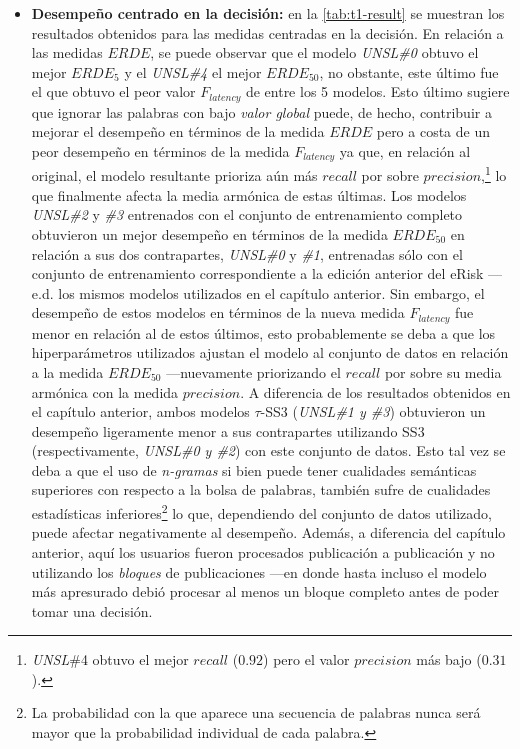 \begin{itemize}
    \item \textbf{Desempeño centrado en la decisión:} en la \autoref{tab:t1-result} se muestran los resultados obtenidos para las medidas centradas en la decisión.
    En relación a las medidas $ERDE$, se puede observar que el modelo \emph{UNSL\#0} obtuvo el mejor $ERDE_5$ y el \emph{UNSL\#4} el mejor $ERDE_{50}$, no obstante, este último fue el que obtuvo el peor valor $F_{latency}$ de entre los 5 modelos.
    Esto último sugiere que ignorar las palabras con bajo \emph{valor global} puede, de hecho, contribuir a mejorar el desempeño en términos de la medida $ERDE$ pero a costa de un peor desempeño en términos de la medida $F_{latency}$ ya que, en relación al original, el modelo resultante prioriza aún más $recall$ por sobre $precision$,\footnote{\emph{UNSL}\#4 obtuvo el mejor $recall$ ($0.92$) pero el valor $precision$ más bajo ($0.31$).} lo que finalmente afecta la media armónica de estas últimas.
    Los modelos \emph{UNSL\#2} y \emph{\#3} entrenados con el conjunto de entrenamiento completo obtuvieron un mejor desempeño en términos de la medida $ERDE_{50}$ en relación a sus dos contrapartes, \emph{UNSL\#0} y \emph{\#1}, entrenadas sólo con el conjunto de entrenamiento correspondiente a la edición anterior del eRisk ---e.d. los mismos modelos utilizados en el capítulo anterior.
    Sin embargo, el desempeño de estos modelos en términos de la nueva medida $F_{latency}$ fue menor en relación al de estos últimos, esto probablemente se deba a que los hiperparámetros utilizados ajustan el modelo al conjunto de datos en relación a la medida $ERDE_{50}$ ---nuevamente priorizando el $recall$ por sobre su media armónica con la medida $precision$.
    A diferencia de los resultados obtenidos en el capítulo anterior, ambos modelos $\tau$-SS3 (\emph{UNSL\#1 y \#3}) obtuvieron un desempeño ligeramente menor a sus contrapartes utilizando SS3 (respectivamente, \emph{UNSL\#0 y \#2}) con este conjunto de datos.
    Esto tal vez se deba a que el uso de \emph{n-gramas} si bien puede tener cualidades semánticas superiores con respecto a la bolsa de palabras, también sufre de cualidades estadísticas inferiores\footnote{La probabilidad con la que aparece una secuencia de palabras nunca será mayor que la probabilidad individual de cada palabra.} lo que, dependiendo del conjunto de datos utilizado, puede afectar negativamente al desempeño.
    Además, a diferencia del capítulo anterior, aquí los usuarios fueron procesados publicación a publicación y no utilizando los \emph{bloques} de publicaciones ---en donde hasta incluso el modelo más apresurado debió procesar al menos un bloque completo antes de poder tomar una decisión.

\end{itemize}
